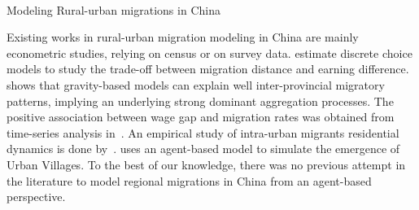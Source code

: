 \paragraph{}{Modeling Rural-urban migrations in China}






Existing works in rural-urban migration modeling in China are mainly econometric studies, relying on census or on survey data. \cite{zhang2013measuring} estimate discrete choice models to study the trade-off between migration distance and earning difference. \cite{fan2005modeling} shows that gravity-based models can explain well inter-provincial migratory patterns, implying an underlying strong dominant aggregation processes. The positive association between wage gap and migration rates was obtained from time-series analysis in~\cite{zhang2003rural}. An empirical study of intra-urban migrants residential dynamics is done by~\cite{wu2006migrant}. \cite{xie2007simulating} uses an agent-based model to simulate the emergence of Urban Villages.
To the best of our knowledge, there was no previous attempt in the literature to model regional migrations in China from an agent-based perspective.




